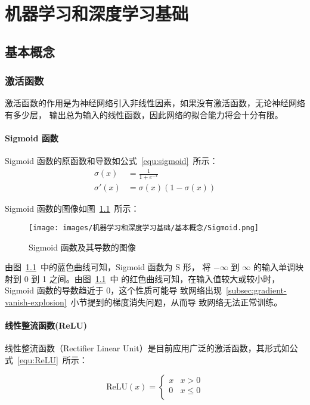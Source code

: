 \part{机器学习和深度学习基础}

\chapter{基本概念}

\section{激活函数}

激活函数的作用是为神经网络引入非线性因素，如果没有激活函数，无论神经网络有多少层，
输出总为输入的线性函数，因此网络的拟合能力将会十分有限。

\subsection{Sigmoid 函数}
\label{subsec:Sigmoid}

Sigmoid 函数的原函数和导数如公式~\ref{equ:sigmoid}~所示：
\begin{align}
  \label{equ:sigmoid}
  \sigma(x) & = \frac{1}{1 + e^{-x}} \\
  \sigma'(x) & = \sigma(x) (1-\sigma(x))
\end{align}

Sigmoid 函数的图像如图~\ref{fig:sigmoid}~所示：

\begin{figure}[ht]
  \centering
  \texttt{[image: images/机器学习和深度学习基础/基本概念/Sigmoid.png]}
  \caption{Sigmoid 函数及其导数的图像}
  \label{fig:sigmoid}
\end{figure}

由图~\ref{fig:sigmoid}~中的蓝色曲线可知，Sigmoid 函数为 S 形，
将 $-\infty$ 到 $\infty$ 的输入单调映射到 0 到 1 之间。由图~\ref{fig:sigmoid}~中
的红色曲线可知，在输入值较大或较小时，Sigmoid 函数的导数趋近于 0，这个性质可能导
致网络出现~\ref{subsec:gradient-vanish-explosion}~小节提到的梯度消失问题，从而导
致网络无法正常训练。

\subsection{线性整流函数(ReLU)}

线性整流函数（Rectifier Linear Unit）是目前应用广泛的激活函数，其形式如公
式~\ref{equ:ReLU}~所示：

\begin{equation}
  \label{equ:ReLU}
  \mathrm{ReLU}(x) = \left\{
    \begin{array}{lr}
      x & x > 0 \\
      0 & x \leq 0 \\
    \end{array}
  \right.
\end{equation}

